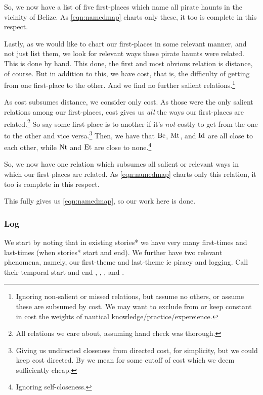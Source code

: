 			So, we now have a list of five first-places which name all pirate haunts in the vicinity of Belize. As \ref{eqn:namedmap} charts only these, it too is complete in this respect.
		
			Lastly, as we would like to chart our first-places in some relevant manner, and not just list them, we look for relevant ways these pirate haunts were related. This is done by hand. This done, the first and most obvious relation is distance, of course. But in addition to this, we have cost, that is, the difficulty of getting from one first-place to the other. And we find no further salient relations.\footnote{Ignoring non-salient or missed relations, but assume no others, or assume these are subsumed by cost. We may want to exclude from or keep constant in cost the weights of nautical knowledge/practice/expereience.}
			
			As cost subsumes distance, we consider only cost. As those were the only salient relations among our first-places, cost gives us \emph{all} the ways our first-places are related.\footnote{All relations we care about, assuming hand check was thorough.} So say some first-place is  to another if it's \emph{not} costly to get from the one to the other and vice versa.\footnote{Giving us undirected closeness from directed cost, for simplicity, but we could keep cost directed. By  we mean for some cutoff of cost which we deem sufficiently cheap.} Then, we have that \(\operatorname{Bc}\), \(\operatorname{Mt}\), and \(\operatorname{Id}\) are all close to each other, while \(\operatorname{Nt}\) and \(\operatorname{Et}\) are close to none.\footnote{Ignoring self-closeness.}
			
			So, we now have one relation which subsumes all salient or relevant ways in which our first-places are related. As \ref{eqn:namedmap} charts only this relation, it too is complete in this respect.
			
			This fully gives us \ref{eqn:namedmap}, so our work here is done.
		\subsubsection{Log}
		\label{sss:log}
			We start by noting that in existing stories* we have very many first-times and last-times (when stories* start and end). We further have two relevant phenomena, namely, our first-theme and last-theme ie piracy and logging. Call their temporal start and end , , , and .
			
